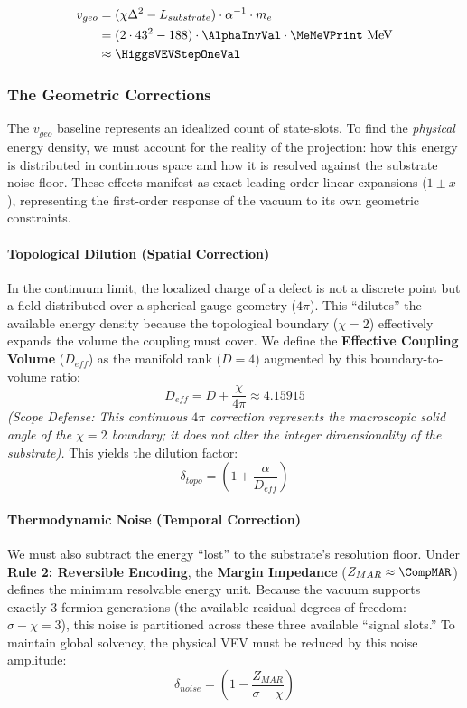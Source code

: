 \begin{equation}
\begin{split}
v_{geo} &= (\chi \Delta^2 - L_{substrate}) \cdot \alpha^{-1} \cdot m_e \\
&= (2 \cdot 43^2 - 188) \cdot \AlphaInvVal \cdot \MeMeVPrint \text{ MeV} \\
&\approx \HiggsVEVStepOneVal
\end{split}
\end{equation}

\subsubsection{The Geometric Corrections}
The $v_{geo}$ baseline represents an idealized count of state-slots. To find the \textit{physical} energy density, we must account for the reality of the projection: how this energy is distributed in continuous space and how it is resolved against the substrate noise floor. These effects manifest as exact leading-order linear expansions ($1 \pm x$), representing the first-order response of the vacuum to its own geometric constraints.

\paragraph{Topological Dilution (Spatial Correction)}
In the continuum limit, the localized charge of a defect is not a discrete point but a field distributed over a spherical gauge geometry ($4\pi$). This ``dilutes'' the available energy density because the topological boundary ($\chi=2$) effectively expands the volume the coupling must cover. We define the \textbf{Effective Coupling Volume} ($D_{eff}$) as the manifold rank ($D=4$) augmented by this boundary-to-volume ratio:
\begin{equation}
D_{eff} = D + \frac{\chi}{4\pi} \approx 4.15915
\end{equation}
\textit{(Scope Defense: This continuous $4\pi$ correction represents the macroscopic solid angle of the $\chi=2$ boundary; it does not alter the integer dimensionality of the substrate).} This yields the dilution factor:
\begin{equation}
\delta_{topo} = \left( 1 + \frac{\alpha}{D_{eff}} \right)
\end{equation}

\paragraph{Thermodynamic Noise (Temporal Correction)}
We must also subtract the energy ``lost'' to the substrate's resolution floor. Under \textbf{Rule 2: Reversible Encoding}, the \textbf{Margin Impedance} ($Z_{MAR} \approx \CompMAR$) defines the minimum resolvable energy unit. Because the vacuum supports exactly 3 fermion generations (the available residual degrees of freedom: $\sigma - \chi = 3$), this noise is partitioned across these three available ``signal slots.'' To maintain global solvency, the physical VEV must be reduced by this noise amplitude:
\begin{equation}
\delta_{noise} = \left( 1 - \frac{Z_{MAR}}{\sigma - \chi} \right)
\end{equation}

